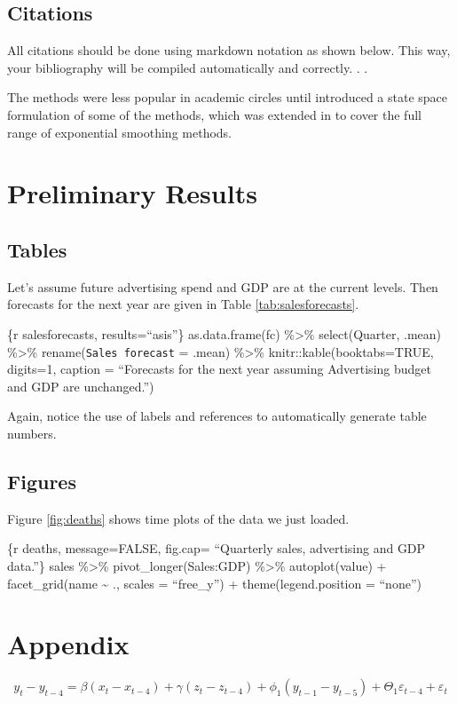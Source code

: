 \documentclass{monashthesis}
\begin{document}
\hypertarget{citations}{%
\section{Citations}\label{citations}}

All citations should be done using markdown notation as shown below. This way, your bibliography will be compiled automatically and correctly. \autocite{FZMP23,BG69}.
\autocite[see][]{FZMP23}.

The methods were less popular in academic circles until \textcite{FZMP23} introduced a state space formulation of some of the methods, which was extended in \textcite{HKSG02} to cover the full range of exponential smoothing methods.

\hypertarget{preliminary-results}{%
\chapter{Preliminary Results}\label{preliminary-results}}

\hypertarget{tables}{%
\section{Tables}\label{tables}}

Let's assume future advertising spend and GDP are at the current levels. Then forecasts for the next year are given in Table \ref{tab:salesforecasts}.

\{r salesforecasts, results=``asis''\}
as.data.frame(fc) \%\textgreater\%
select(Quarter, .mean) \%\textgreater\%
rename(\texttt{Sales\ forecast} = .mean) \%\textgreater\%
knitr::kable(booktabs=TRUE, digits=1,
caption = ``Forecasts for the next year assuming Advertising budget and GDP are unchanged.'')

Again, notice the use of labels and references to automatically generate table numbers.

\hypertarget{figures}{%
\section{Figures}\label{figures}}

Figure \ref{fig:deaths} shows time plots of the data we just loaded.

\{r deaths, message=FALSE, fig.cap= ``Quarterly sales, advertising and GDP data.''\}
sales \%\textgreater\%
pivot\_longer(Sales:GDP) \%\textgreater\%
autoplot(value) +
facet\_grid(name \textasciitilde{} ., scales = ``free\_y'') +
theme(legend.position = ``none'')

\appendix

\hypertarget{appendix}{%
\chapter{Appendix}\label{appendix}}

\begin{equation}
  y_t - y_{t-4} = \beta (x_t-x_{t-4}) + \gamma (z_t-z_{t-4}) + \phi_1 (y_{t-1} - y_{t-5}) + \Theta_1 \varepsilon_{t-4} + \varepsilon_t
\end{equation}

\printbibliography[heading=bibintoc]
\end{document}
